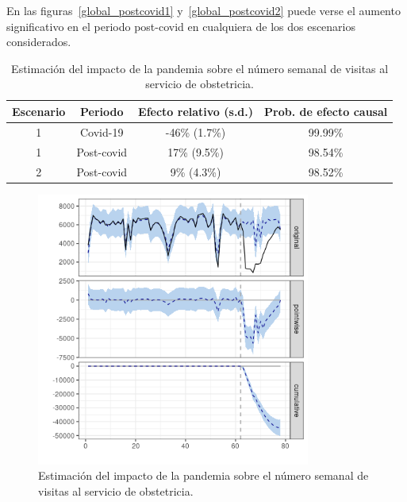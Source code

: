 \documentclass[12pt,twoside]{article} %
\begin{document}
En las figuras~\ref{global_postcovid1} y~\ref{global_postcovid2} puede verse el aumento significativo en el periodo post-covid en cualquiera de los dos escenarios considerados.

\begin{table}[H]\caption{Estimación del impacto de la pandemia sobre el número semanal de visitas al servicio de obstetricia.}
    \centering  
    \begin{tabular}{ |c|c|c|c| }
        \hline
        \textbf{Escenario} & \textbf{Periodo} & \textbf{Efecto relativo (s.d.)} & \textbf{Prob. de efecto causal} \\ 
        \hline
     1 & Covid-19 & -46\% (1.7\%) & 99.99\% \\  
     1 & Post-covid & 17\% (9.5\%) & 98.54\% \\
     \hline   
     2 & Post-covid & 9\% (4.3\%) & 98.52\% \\
     \hline
    \end{tabular}
  \end{table}
  
  \begin{center}
    \begin{figure}[H]
      \includegraphics[width=9cm]{obstetrics_covid.png}\caption{Estimación del impacto de la pandemia sobre el número semanal de visitas al servicio de obstetricia.}
    \end{figure}
    \end{center}
    
\end{document}
